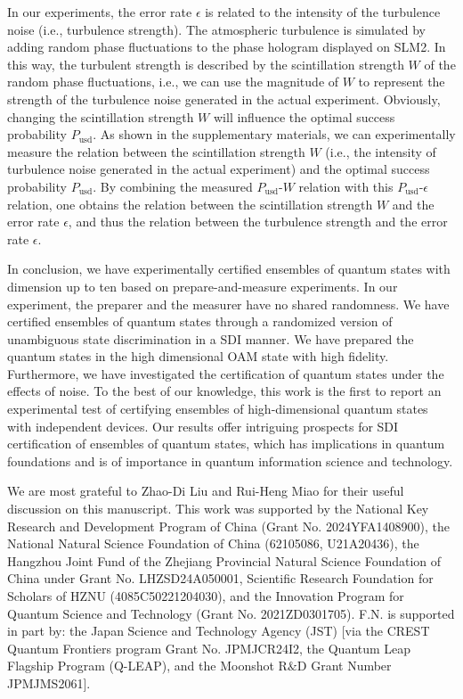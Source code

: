 \documentclass[letterpaper,preprint,superscriptaddress,floatfix,showpacs]{revtex4}
\begin{document}
In our experiments, the error rate $\epsilon$ is related to the intensity of the turbulence noise (i.e., turbulence strength). The atmospheric turbulence is simulated by adding random phase fluctuations to the phase hologram displayed on SLM2. In this way, the turbulent strength is described by the scintillation strength $W$ of the random phase fluctuations, i.e., we can use the magnitude of $W$ to represent the strength of the turbulence noise generated in the actual experiment. Obviously, changing the scintillation strength $W$ will influence the optimal success probability $P_{\mathrm{usd}}$. As shown in the supplementary materials, we can experimentally measure the relation between the scintillation strength $W$ (i.e., the intensity of turbulence noise generated in the actual experiment) and the optimal success probability $P_{\mathrm{usd}}$. By combining the measured $P_{\mathrm{usd}}$-$W$ relation with this $P_{\mathrm{usd}}$-$\epsilon$ relation, one obtains the relation between the scintillation strength $W$ and the error rate $\epsilon$, and thus the relation between the turbulence strength and the error rate $\epsilon$.









In conclusion, we have experimentally certified ensembles of quantum states with dimension up to ten based on prepare-and-measure experiments. In our experiment, the preparer and the measurer have no shared randomness. We have certified ensembles of quantum states through a randomized version of unambiguous state discrimination in a SDI manner. We have prepared the quantum states in the high dimensional OAM state with high fidelity. Furthermore, we have investigated the certification of quantum states under the effects of noise. To the best of our knowledge, this work is the first to report an experimental test of certifying ensembles of high-dimensional quantum states with independent devices. Our results offer intriguing prospects for SDI certification of ensembles of quantum states, which has implications in quantum foundations and is of importance in quantum information science and technology.







We are most grateful to Zhao-Di Liu and Rui-Heng Miao for their useful discussion on this manuscript. This work was supported by the National Key Research and Development Program of China (Grant No. 2024YFA1408900), the National Natural Science Foundation of China (62105086, U21A20436), the Hangzhou Joint Fund of the Zhejiang Provincial Natural Science Foundation of China under Grant No. LHZSD24A050001, Scientific Research Foundation for Scholars of HZNU (4085C50221204030), and the Innovation Program for Quantum Science and Technology (Grant No. 2021ZD0301705). F.N. is supported in part by: the Japan Science and Technology Agency (JST) [via the CREST Quantum Frontiers program Grant No. JPMJCR24I2, the Quantum Leap Flagship Program (Q-LEAP), and the Moonshot R$\&$D Grant Number JPMJMS2061].
\end{document}
